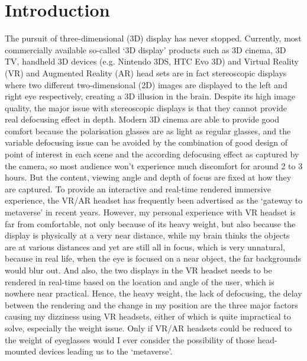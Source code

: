 
\chapter{Introduction}  %
\graphicspath{{Chapter1/Figs/}}

The pursuit of three-dimensional (3D) display has never stopped. Currently, most commercially available so-called `3D display' products such as 3D cinema, 3D TV, handheld 3D devices (e.g. Nintendo 3DS, HTC Evo 3D) and Virtual Reality (VR) and Augmented Reality (AR) head sets are in fact stereoscopic displays where two different two-dimensional (2D) images are displayed to the left and right eye respectively, creating a 3D illusion in the brain. Despite its high image quality, the major issue with stereoscopic displays is that they cannot provide real defocusing effect in depth. Modern 3D cinema are able to provide good comfort because the polarisation glasses are as light as regular glasses, and the variable defocusing issue can be avoided by the combination of good design of point of interest in each scene and the according defocusing effect as captured by the camera, so most audience won't experience much discomfort for around 2 to 3 hours. But the content, viewing angle and depth of focus are fixed at how they are captured. To provide an interactive and real-time rendered immersive experience, the VR/AR headset has frequently been advertised as the `gateway to metaverse' in recent years. However, my personal experience with VR headset is far from comfortable, not only because of its heavy weight, but also because the display is physically at a very near distance, while my brain thinks the objects are at various distances and yet are still all in focus, which is very unnatural, because in real life, when the eye is focused on a near object, the far backgrounds would blur out. And also, the two displays in the VR headset needs to be rendered in real-time based on the location and angle of the user, which is nowhere near practical. Hence, the heavy weight, the lack of defocusing, the delay between the rendering and the change in my position are the three major factors causing my dizziness using VR headsets, either of which is quite impractical to solve, especially the weight issue. Only if VR/AR headsets could be reduced to the weight of eyeglasses would I ever consider the possibility of those head-mounted devices leading us to the `metaverse'.


